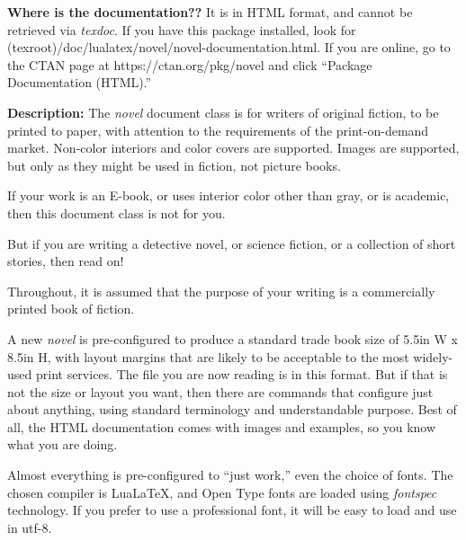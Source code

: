 \documentclass{novel} %
\begin{document}
\begin{ChapterStart}[8]
\vspace{\nbs} %
\vspace{\nbs}
\vspace{\nbs}
\end{ChapterStart}

\textbf{Where is the documentation??} It is in HTML format, and cannot be retrieved via  \textit{texdoc}. If you have this package installed, look for (texroot)/doc/lualatex/novel/novel-documentation.html. If you are online, go to the CTAN page at https://ctan.org/pkg/novel and click ``Package Documentation (HTML).''

\scenebreak

\textbf{Description:} The \emph{novel} document class is for writers of original fiction, to be printed to paper, with attention to the requirements of the print-on-demand market. Non-color interiors and color covers are supported. Images are supported, but only as they might be used in fiction, not picture books.

If your work is an E-book, or uses interior color other than gray, or is academic, then this document class is not for you. 

But if you are writing a detective novel, or science fiction, or a collection of short stories, then read on!


Throughout, it is assumed that the purpose of your writing is a commercially printed book of fiction.

A new \emph{novel} is pre-configured to produce a standard trade book size of 5.5in W x 8.5in H, with layout margins that are likely to be acceptable to the most widely-used print services. The file you are now reading is in this format. But if that is not the size or layout you want, then there are commands that configure just about anything, using standard terminology and understandable purpose. Best of all, the HTML documentation comes with images and examples, so you know what you are doing.

Almost everything is pre-configured to “just work,” even the choice of fonts. The chosen compiler is LuaLaTeX, and Open Type fonts are loaded using \textit{fontspec} technology. If you prefer to use a professional font, it will be easy to load and use in utf-8.
\end{document}
